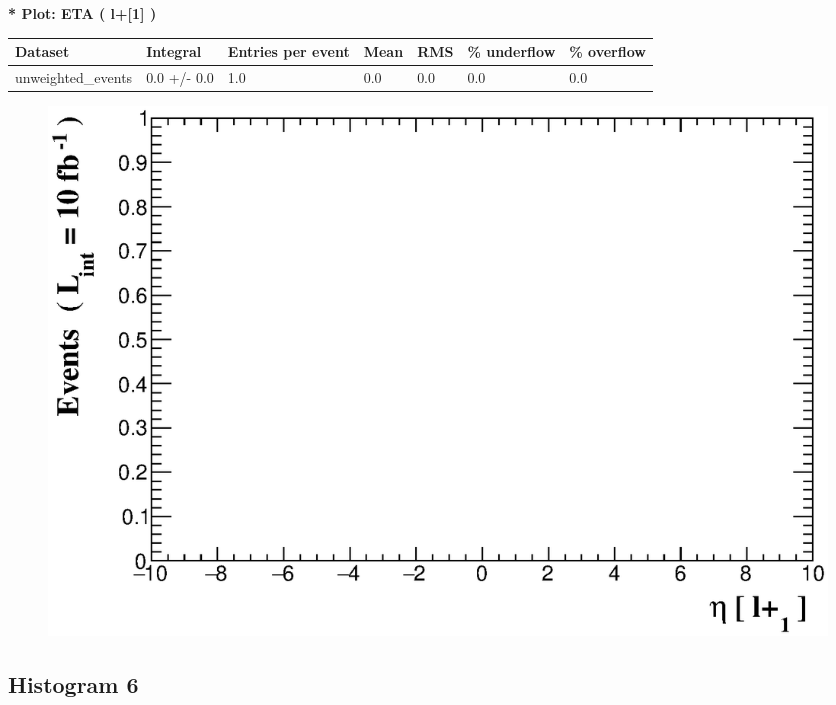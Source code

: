 \documentclass[a4paper, 10pt]{article}
\begin{document}
\textbf{* Plot: ETA ( l+[1] ) }\\
   \begin{table}[H]
  \begin{center}
    \begin{tabular}{|m{23.0mm}|m{23.0mm}|m{18.0mm}|m{19.0mm}|m{19.0mm}|m{19.0mm}|m{19.0mm}|}
      \hline
      {\cellcolor{yellow}         Dataset}& {\cellcolor{yellow}         Integral}& {\cellcolor{yellow}         Entries per event}& {\cellcolor{yellow}         Mean}& {\cellcolor{yellow}         RMS}& {\cellcolor{yellow}         \% underflow}& {\cellcolor{yellow}         \% overflow}\\
      \hline
      {\cellcolor{white}         unweighted\_events}& {\cellcolor{white}         0.0 +/\-- 0.0}& {\cellcolor{white}         1.0}& {\cellcolor{white}         0.0}& {\cellcolor{white}         0.0}& {\cellcolor{green}         0.0}& {\cellcolor{green}         0.0}\\
\hline
    \end{tabular}
  \end{center}
\end{table}

\begin{figure}[H]
  \begin{center}
    \includegraphics[scale=0.45]{selection_4.eps}\\
\caption{   }
  \end{center}
\end{figure}
      \newpage
\subsection{ Histogram 6}
\end{document}
